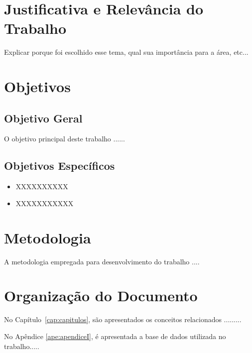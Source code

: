 \section{Justificativa e Relevância do Trabalho}
\label{sec:justificativa}
Explicar porque foi escolhido esse tema, qual sua importância para a área, etc...




\section{Objetivos}
\label{sec:objetivo}

\subsection{Objetivo Geral}
\label{sec:objgeral}
O objetivo principal deste trabalho ......


\subsection{Objetivos Específicos}
\label{sec:objespecificos}

\begin{itemize}
  \item XXXXXXXXXX

  \item XXXXXXXXXXX

\end{itemize}



\section{Metodologia}
\label{sec:metodologia}

A metodologia empregada para desenvolvimento do trabalho ....




\section{Organização do Documento}
\label{sec:organizacao}

No Capítulo~\ref{cap:capitulos}, são apresentados os conceitos relacionados .........

No Apêndice \ref{ape:apendiceI}, é apresentada a base de dados utilizada no trabalho.....
